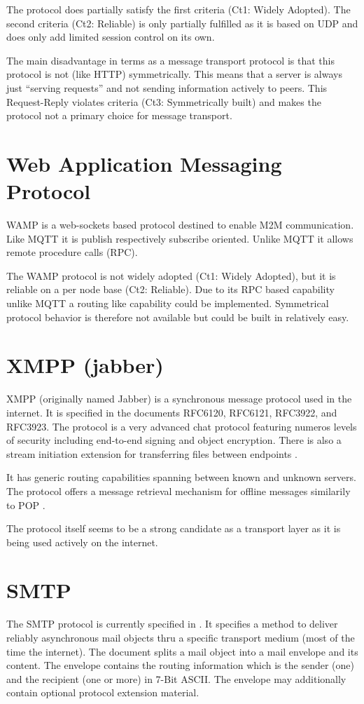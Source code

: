 \documentclass[a4paper,appendixprefix,pdfusetitle,twocolumn,fontsize=8pt,draft,DIV=calc]{scrbook}
\begin{document}
The protocol does partially satisfy the first criteria (Ct1: Widely Adopted). The second criteria (Ct2: Reliable) is only partially fulfilled as it is based on UDP and does only add limited session control on its own.

The main disadvantage in terms as a message transport protocol is that this protocol is not (like HTTP) symmetrically. This means that a server is always just ``serving requests'' and not sending information actively to peers. This Request-Reply violates criteria (Ct3: Symmetrically built) and makes the protocol not a primary choice for message transport. 

\section{Web Application Messaging Protocol}
WAMP is a web-sockets based protocol destined to enable M2M communication. Like MQTT it is publish respectively subscribe oriented. Unlike MQTT it allows remote procedure calls (RPC).

The WAMP protocol is not widely adopted (Ct1: Widely Adopted), but it is reliable on a per node base (Ct2: Reliable). Due to its RPC based capability unlike MQTT a routing like capability could be implemented. Symmetrical protocol behavior is therefore not available but could be built in relatively easy.

\section{XMPP (jabber)}
XMPP (originally named Jabber) is a synchronous message protocol used in the internet. It is specified in the documents RFC6120\cite{RFC6120}, RFC6121\cite{RFC6120}, RFC3922\cite{RFC3922}, and RFC3923\cite{RFC3923}. The protocol is a very advanced chat protocol featuring numeros levels of security including end-to-end signing and object encryption\cite{RFC3923}. There is also a stream initiation extension for transferring files between endpoints \cite{xep0096}.

It has generic routing capabilities spanning between known and unknown servers. The protocol offers a message retrieval mechanism for offline messages similarily to POP \cite{xep0013}.

The protocol itself seems to be a strong candidate as a transport layer as it is being used actively on the internet.

\section{SMTP}
The SMTP protocol is currently specified in \cite{RFC5321}. It specifies a method to deliver reliably asynchronous mail objects thru a specific transport medium (most of the time the internet). The document splits a mail object into a mail envelope and its content. The envelope contains the routing information which is the sender (one) and the recipient (one or more) in 7-Bit ASCII. The envelope may additionally contain optional protocol extension material. 
\end{document}
